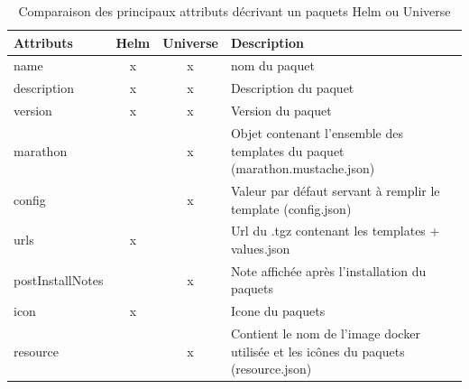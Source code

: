 \documentclass[11pt,fleqn]{book} %
\begin{document}
\begin{table}[H]
\hspace{-1.8cm}
\begin{tabular}{@{}lccl@{}}
\toprule
Attributs        & \multicolumn{1}{l}{Helm} & \multicolumn{1}{l}{Universe} & Description                                                                 \\ \midrule
name             & x                        & x                            & nom du paquet                                                               \\
description      & x                        & x                            & Description du paquet                                                       \\
version          & x                        & x                            & Version du paquet                                                           \\
marathon         &                          & x                            & Objet contenant l'ensemble des templates du paquet (marathon.mustache.json) \\
config           &                          & x                            & Valeur par défaut servant à remplir le template (config.json)               \\
urls             & x                        &                              & Url du .tgz contenant les templates + values.json                            \\
postInstallNotes &                          & x                            & Note affichée après l'installation du paquets                               \\
icon             & x                        &                              & Icone du paquets                                                            \\
resource         &                          & x                            & Contient le nom de l'image docker utilisée et les icônes du paquets (resource.json)        \\ \bottomrule
\end{tabular}
\caption{Comparaison des principaux attributs décrivant un paquets Helm ou Universe \newline}
\label{tab:my-table}
\end{table}
\end{document}
